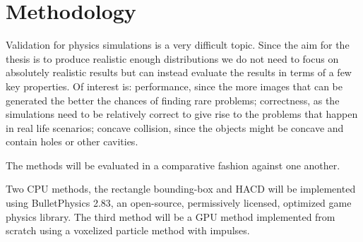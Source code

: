 \section{Methodology}
Validation for physics simulations is a very difficult topic. Since the aim for
the thesis is to produce realistic enough distributions we do not need to focus
on absolutely realistic results but can instead evaluate the results in terms of
a few key properties. Of interest is: performance, since the more images
that can be generated the better the chances of finding rare problems; correctness,
as the simulations need to be relatively correct to give rise to the problems that
 happen in real life scenarios; concave collision, since the objects might
 be concave and contain holes or other cavities.

The methods will be evaluated in a comparative fashion against one another.

Two CPU methods, the rectangle bounding-box and HACD will be implemented using
BulletPhysics 2.83, an open-source, permissively licensed, optimized game physics
library. The third method will be a GPU method implemented from scratch using a
voxelized particle method with impulses.
